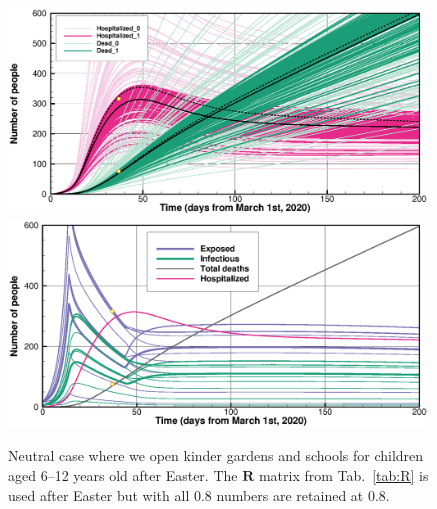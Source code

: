 \documentclass[twoside,11pt]{article}
\newcommand{\bmR}{{\mathbf{R}}}
\begin{document}
\begin{figure}[p]
\begin{center}
\includegraphics[width=0.99\textwidth]{openA08.eps} \\
\includegraphics[width=0.99\textwidth]{openB08.eps} 
\end{center}
\caption{Neutral case where we open kinder gardens and schools for children aged 6--12 years old after Easter. 
The $\bmR$ matrix from Tab.~\ref{tab:R} is used after Easter but with all 0.8 numbers are retained at 0.8.
\label{fig:open08}}
\end{figure}
\end{document}

